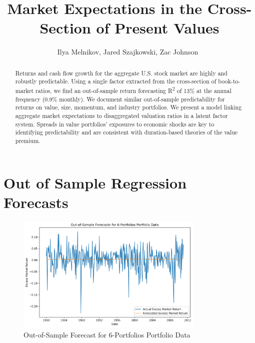 \documentclass[12pt]{article}
\begin{document}
\title{
Market Expectations in the Cross-Section of Present Values
}

\author{
Ilya Melnikov, Jared Szajkowski, Zac Johnson\
}
\begin{titlepage}
\maketitle

\doublespacing
\begin{abstract}
    Returns and cash flow growth for the aggregate U.S. stock market are highly and robustly predictable. 
    Using a single factor extracted from the cross-section of book-to-market ratios, 
    we find an out-of-sample return forecasting R\textsuperscript{2} of 13\% at the annual frequency (0.9\% monthly). 
    We document similar out-of-sample predictability for returns on value, size, momentum, and industry portfolios. 
    We present a model linking aggregate market expectations to disaggregated valuation ratios in a latent factor system. 
    Spreads in value portfolios’ exposures to economic shocks are key to identifying predictability and are consistent 
    with duration-based theories of the value premium.
\end{abstract}

\end{titlepage}

\doublespacing
\section{Out of Sample Regression Forecasts}

\begin{figure}[h]
    \centering
    \includegraphics[width=0.8\textwidth]{plots/Out_of_Sample_Forecasts_for_6_Portfolios_Portfolio_Data.png}
    \caption{Out-of-Sample Forecast for 6-Portfolios Portfolio Data}
    \label{fig:forecast_chart}
\end{figure}
\end{document}
